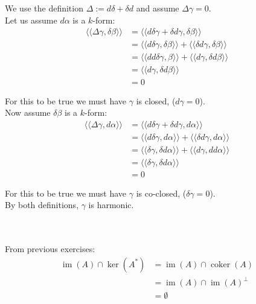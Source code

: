 \documentclass{article}
\def\lap{\Delta}
\def\ll{\langle\langle}
\def\rr{\rangle\rangle}
\DeclareMathOperator{\img}{im}
\DeclareMathOperator{\coker}{coker}
\begin{document}
\vspace{1.8cm}
\\\\


We use the definition $\lap := d\delta + \delta d$ and assume $\lap \gamma = 0$.\\

Let us assume $d\alpha$ is a $k$-form:
\begin{align*}
    \ll \Delta \gamma, \delta \beta \rr &= \ll d \delta \gamma + \delta d \gamma, \delta \beta \rr \\
        &= \ll d \delta \gamma, \delta \beta \rr + \ll \delta d \gamma, \delta \beta \rr \\
        &= \ll d d \delta \gamma, \beta \rr + \ll d \gamma, \delta d \beta \rr \\
        &= \ll d \gamma, \delta d \beta \rr \\
        &= 0
\end{align*}

For this to be true we must have $\gamma$ is closed, ($d \gamma = 0$).\\

Now assume $\delta \beta$ is a $k$-form:
\begin{align*}
    \ll \Delta \gamma, d \alpha \rr &= \ll d \delta \gamma + \delta d \gamma, d \alpha \rr \\
        &= \ll d \delta \gamma, d \alpha \rr + \ll \delta d \gamma, d \alpha \rr \\
        &= \ll \delta \gamma, \delta d \alpha \rr + \ll d \gamma, d d \alpha \rr \\
        &= \ll \delta \gamma, \delta d \alpha \rr \\
        &= 0
\end{align*}

For this to be true we must have $\gamma$ is co-closed, ($\delta \gamma = 0$).\\

By both definitions, $\gamma$ is harmonic.


\vspace{1.8cm}
\\\\


From previous exercises:
\begin{align*}
    \img(A) \cap \ker(A^*) &= \img(A) \cap \coker(A) \\
        &= \img(A) \cap \img(A)^\perp \\
        &= \emptyset
\end{align*}
\end{document}
